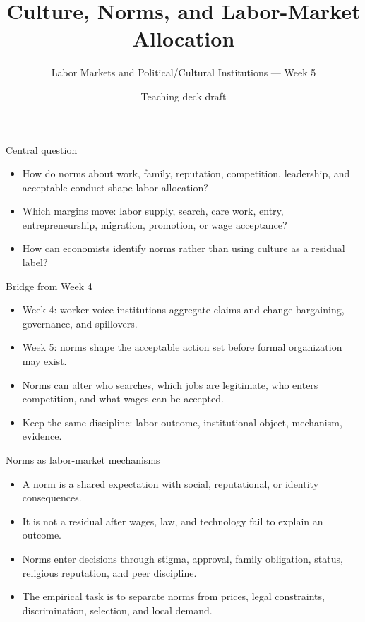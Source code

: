 \documentclass[aspectratio=169,11pt]{beamer}
\title{Culture, Norms, and Labor-Market Allocation}
\subtitle{Labor Markets and Political/Cultural Institutions --- Week 5}
\author{Teaching deck draft}
\date{}
\begin{document}
\begin{frame}
  \titlepage
\end{frame}

\begin{frame}{Central question}
\begin{itemize}
    \item How do norms about work, family, reputation, competition, leadership, and acceptable conduct shape labor allocation?
    \item Which margins move: labor supply, search, care work, entry, entrepreneurship, migration, promotion, or wage acceptance?
    \item How can economists identify norms rather than using culture as a residual label?
\end{itemize}
\end{frame}

\begin{frame}{Bridge from Week 4}
\begin{itemize}
    \item Week 4: worker voice institutions aggregate claims and change bargaining, governance, and spillovers.
    \item Week 5: norms shape the acceptable action set before formal organization may exist.
    \item Norms can alter who searches, which jobs are legitimate, who enters competition, and what wages can be accepted.
    \item Keep the same discipline: labor outcome, institutional object, mechanism, evidence.
\end{itemize}
\end{frame}

\begin{frame}{Norms as labor-market mechanisms}
\begin{itemize}
    \item A norm is a shared expectation with social, reputational, or identity consequences.
    \item It is not a residual after wages, law, and technology fail to explain an outcome.
    \item Norms enter decisions through stigma, approval, family obligation, status, religious reputation, and peer discipline.
    \item The empirical task is to separate norms from prices, legal constraints, discrimination, selection, and local demand.
\end{itemize}
\end{frame}
\end{document}
